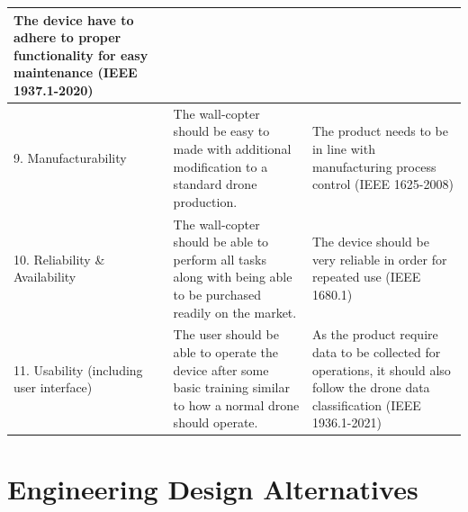 \documentclass[12pt]{article}
\begin{document}
\begin{longtable}{ | m{4.25cm} | m{5cm}| m{5.4cm} | }
            The device have to adhere to proper functionality for easy maintenance (IEEE 1937.1-2020) \\\hline
            9. Manufacturability &
            The wall-copter should be easy to made with additional modification to a standard drone production. &
            The product needs to be in line with manufacturing process control (IEEE 1625-2008) \\\hline
            10. Reliability \& Availability &
            The wall-copter should be able to perform all tasks along with being able to be purchased readily on the market. &
            The device should be very reliable in order for repeated use (IEEE 1680.1) \\\hline
            11. Usability (including user interface) &
            The user should be able to operate the device after some basic training similar to how a normal drone should operate. &
            As the product require data to be collected for operations, it should also follow the drone data classification (IEEE 1936.1-2021) \\\hline
        \end{longtable}
    
    \newpage
    \section{Engineering Design Alternatives}
\end{document}
